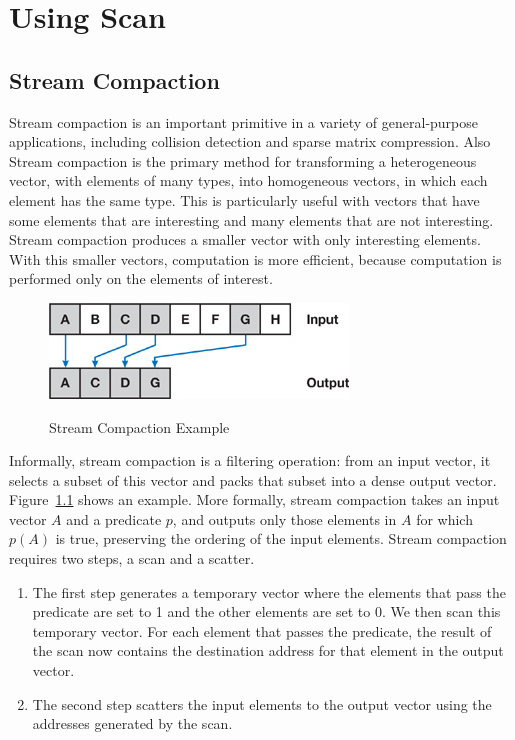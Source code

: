 \documentclass[Ingles]{ic-tese-v1}
\begin{document}
\chapter{Using Scan}
\label{cap:ScanUse}

\section{Stream Compaction}

Stream compaction is an important primitive in a variety of general-purpose applications, including collision detection and sparse matrix compression. Also Stream compaction is the primary method for transforming a heterogeneous vector, with elements of many types, into homogeneous vectors, in which each element has the same type. This is particularly useful with vectors that have some elements that are interesting and many elements that are not interesting. Stream compaction produces a smaller vector with only interesting elements. With this smaller vectors, computation is more efficient, because computation is performed only on the  elements of interest.\\
\begin{figure}[t]
	\centering
	\caption{Stream Compaction Example}
	\includegraphics[scale=1.2]{images/stremexample.jpg}
	\label{fig:streamexample}
\end{figure}
Informally, stream compaction is a filtering operation: from an input vector, it selects a subset of this vector and packs that subset into a dense output vector. Figure~\ref{fig:streamexample} shows an example. More formally, stream compaction takes an input vector $A$ and a predicate $p$, and outputs only those elements in $A$ for which $p(A)$ is true, preserving the ordering of the input elements.
Stream compaction requires two steps, a scan and a scatter.
\begin{enumerate}
\item The first step generates a temporary vector where the elements that pass the predicate are set to 1 and the other elements are set to 0. We then scan this temporary vector. For each element that passes the predicate, the result of the scan now contains the destination address for that element in the output vector.
\item The second step scatters the input elements to the output vector using the addresses generated by the scan.
\end{enumerate}
\end{document}
